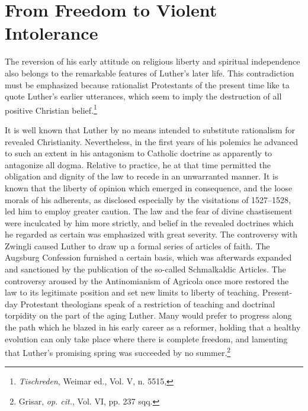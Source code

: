 \section{From Freedom to Violent Intolerance}

The reversion of his early attitude on religious liberty and spiritual
independence also belongs to the remarkable features of Luther’s later
life. This contradiction must be emphasized because rationalist Protestants
of the present time like ta quote Luther’s earlier utterances,
which seem to imply the destruction of all positive Christian belief.\footnote{\textit{Tischreden}, Weimar ed., Vol. V, n. 5515,}

It is well known that Luther by no means intended to substitute
rationalism for revealed Christianity. Nevertheless, in the first years of
his polemics he advanced to such an extent in his antagonism to Catholic
doctrine as apparently to antagonize all dogma. Relative to practice,
he at that time permitted the obligation and dignity of the law
to recede in an unwarranted manner. It is known that the liberty of
opinion which emerged in consequence, and the loose morals of his
adherents, as disclosed especially by the visitations of 1527--1528, led
him to employ greater caution. The law and the fear of divine
chastisement were inculcated by him more strictly, and belief in the
revealed doctrines which he regarded as certain was emphasized with
great severity. The controversy with Zwingli caused Luther to draw
up a formal series of articles of faith. The Augsburg Confession furnished
a certain basis, which was afterwards expanded and sanctioned
by the publication of the so-called Schmalkaldic Articles. The controversy
aroused by the Antinomianism of Agricola once more restored
the law to its legitimate position and set new limits to liberty
of teaching. Present-day Protestant theologians speak of a restriction
of teaching and doctrinal torpidity on the part of the aging Luther.
Many would prefer to progress along the path which he blazed in
his early career as a reformer, holding that a healthy evolution can
only take place where there is complete freedom, and lamenting that
Luther’s promising spring was succeeded by no summer.\footnote
{Grisar, \textit{op. cit.}, Vol. VI, pp. 237 sqq.}

